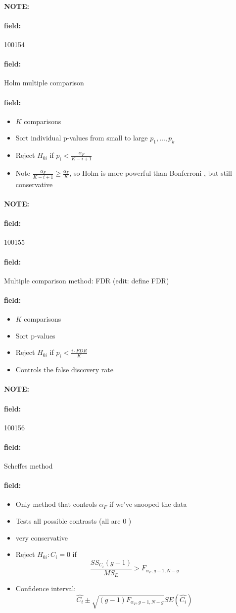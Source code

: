 \documentclass[12pt]{article}
\newenvironment{note}{\paragraph{NOTE:}}{}
\newenvironment{field}{\paragraph{field:}}{}
\begin{document}
\begin{note}
 \begin{field}
  \tiny 100154
 \end{field}
 \begin{field}
  Holm multiple comparison
 \end{field}
 \begin{field}
  \begin{itemize}
   \item $K$ comparisons
   \item Sort individual p-values from small to large $p_1, \ldots, p_k$
   \item Reject $H_{0i}$ if $p_i < \frac{\alpha_F}{K-i+1}$
   \item Note $\frac{\alpha_F}{K-i+1} \geq \frac{\alpha_F}{K}$, so Holm is more powerful than Bonferroni , but still conservative
  \end{itemize}
 \end{field}
\end{note}

\begin{note}
 \begin{field}
  \tiny 100155
 \end{field}
 \begin{field}
  Multiple comparison method: FDR
  (edit: define FDR)
 \end{field}
 \begin{field}
  \begin{itemize}
   \item $K$ comparisons
   \item Sort p-values
   \item Reject $H_{0i}$ if $p_i < \frac{i \cdot FDR}{K}$
   \item Controls the false discovery rate
  \end{itemize}
 \end{field}
\end{note}



\begin{note}
 \begin{field}
  \tiny 100156
 \end{field}
 \begin{field}
  Scheffes method
 \end{field}
 \begin{field}
  \begin{itemize}
   \item Only method that controls $\alpha_F$ if we've snooped the data
   \item Tests all possible contrasts (all are 0 )
   \item very conservative
   \item Reject $H_{0i}: C_i = 0$ if $$\frac{SS_{C_i}(g-1)}{MS_E} > F_{\alpha_F, g-1, N-g} $$
   \item Confidence interval: $$\hat{C_i} \pm \sqrt{(g-1)F_{\alpha_F, g-1, N-g}}SE(\hat{C_i}) $$
  \end{itemize}
 \end{field}
\end{note}
\end{document}
